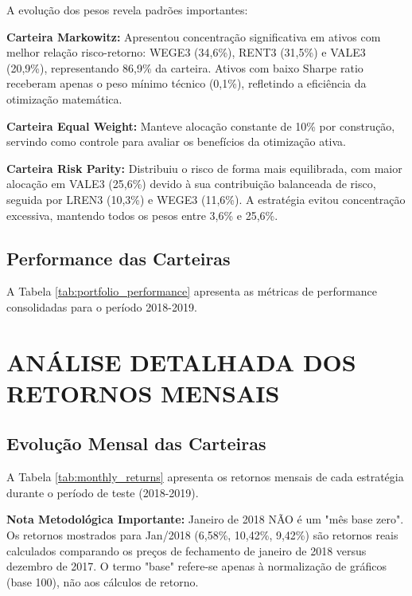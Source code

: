 A evolução dos pesos revela padrões importantes:

\textbf{Carteira Markowitz:} Apresentou concentração significativa em ativos com melhor relação risco-retorno: WEGE3 (34,6\%), RENT3 (31,5\%) e VALE3 (20,9\%), representando 86,9\% da carteira. Ativos com baixo Sharpe ratio receberam apenas o peso mínimo técnico (0,1\%), refletindo a eficiência da otimização matemática.

\textbf{Carteira Equal Weight:} Manteve alocação constante de 10\% por construção, servindo como controle para avaliar os benefícios da otimização ativa.

\textbf{Carteira Risk Parity:} Distribuiu o risco de forma mais equilibrada, com maior alocação em VALE3 (25,6\%) devido à sua contribuição balanceada de risco, seguida por LREN3 (10,3\%) e WEGE3 (11,6\%). A estratégia evitou concentração excessiva, mantendo todos os pesos entre 3,6\% e 25,6\%.

\subsection{Performance das Carteiras}

A Tabela \ref{tab:portfolio_performance} apresenta as métricas de performance consolidadas para o período 2018-2019.



\section{ANÁLISE DETALHADA DOS RETORNOS MENSAIS}

\subsection{Evolução Mensal das Carteiras}

A Tabela \ref{tab:monthly_returns} apresenta os retornos mensais de cada estratégia durante o período de teste (2018-2019).

\textbf{Nota Metodológica Importante:} Janeiro de 2018 NÃO é um "mês base zero". Os retornos mostrados para Jan/2018 (6,58\%, 10,42\%, 9,42\%) são retornos reais calculados comparando os preços de fechamento de janeiro de 2018 versus dezembro de 2017. O termo "base" refere-se apenas à normalização de gráficos (base 100), não aos cálculos de retorno.

